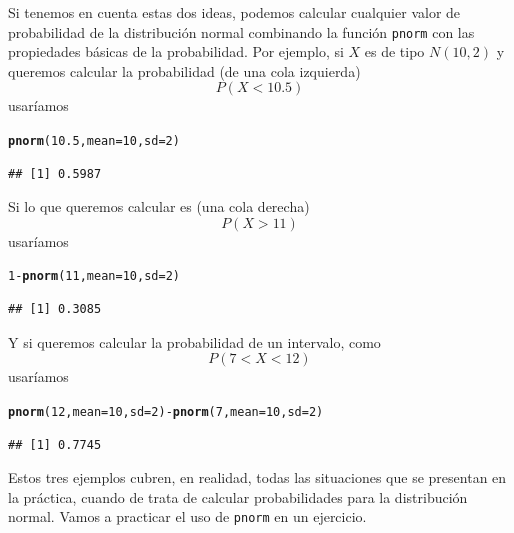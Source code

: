 \documentclass[10pt,a4paper]{article}\usepackage[]{graphicx}\usepackage[]{color}
\makeatletter
\newcommand{\hlnum}[1]{\textcolor[rgb]{0.686,0.059,0.569}{#1}}%
\newcommand{\hlopt}[1]{\textcolor[rgb]{0,0,0}{#1}}%
\newcommand{\hlstd}[1]{\textcolor[rgb]{0.345,0.345,0.345}{#1}}%
\newcommand{\hlkwc}[1]{\textcolor[rgb]{0.333,0.667,0.333}{#1}}%
\newcommand{\hlkwd}[1]{\textcolor[rgb]{0.737,0.353,0.396}{\textbf{#1}}}%
\newenvironment{kframe}{%
 \def\at@end@of@kframe{}%
 \ifinner\ifhmode%
  \def\at@end@of@kframe{\end{minipage}}%
  \begin{minipage}{\columnwidth}%
 \fi\fi%
 \def\FrameCommand##1{\hskip\@totalleftmargin \hskip-\fboxsep
 \colorbox{shadecolor}{##1}\hskip-\fboxsep
     \hskip-\linewidth \hskip-\@totalleftmargin \hskip\columnwidth}%
 \MakeFramed {\advance\hsize-\width
   \@totalleftmargin\z@ \linewidth\hsize
   \@setminipage}}%
 {\par\unskip\endMakeFramed%
 \at@end@of@kframe}
\newenvironment{knitrout}{}{} %
\makeatother
\begin{document}
Si tenemos en cuenta estas dos ideas, podemos calcular cualquier valor de probabilidad de la distribución normal combinando la función {\tt pnorm} con las propiedades básicas de la probabilidad. Por ejemplo, si $X$ es de tipo $N(10,2)$ y queremos calcular la probabilidad (de una cola izquierda)
\[P(X<10.5)\]
usaríamos
\begin{knitrout}
\color{fgcolor}\begin{kframe}
\begin{alltt}
\hlkwd{pnorm}\hlstd{(}\hlnum{10.5}\hlstd{,} \hlkwc{mean}\hlstd{=}\hlnum{10}\hlstd{,} \hlkwc{sd}\hlstd{=}\hlnum{2}\hlstd{)}
\end{alltt}
\begin{verbatim}
## [1] 0.5987
\end{verbatim}
\end{kframe}
\end{knitrout}
Si lo que queremos calcular es (una cola derecha)
\[P(X>11)\]
usaríamos
\begin{knitrout}
\color{fgcolor}\begin{kframe}
\begin{alltt}
    \hlnum{1}\hlopt{-}\hlkwd{pnorm}\hlstd{(}\hlnum{11}\hlstd{,} \hlkwc{mean}\hlstd{=}\hlnum{10}\hlstd{,} \hlkwc{sd}\hlstd{=}\hlnum{2}\hlstd{)}
\end{alltt}
\begin{verbatim}
## [1] 0.3085
\end{verbatim}
\end{kframe}
\end{knitrout}
Y si queremos calcular la probabilidad de un intervalo, como
\[
    P(7<X<12)
\]
usaríamos
\begin{knitrout}
\color{fgcolor}\begin{kframe}
\begin{alltt}
    \hlkwd{pnorm}\hlstd{(}\hlnum{12}\hlstd{,} \hlkwc{mean}\hlstd{=}\hlnum{10}\hlstd{,} \hlkwc{sd}\hlstd{=}\hlnum{2}\hlstd{)} \hlopt{-} \hlkwd{pnorm}\hlstd{(}\hlnum{7}\hlstd{,} \hlkwc{mean}\hlstd{=}\hlnum{10}\hlstd{,} \hlkwc{sd}\hlstd{=}\hlnum{2}\hlstd{)}
\end{alltt}
\begin{verbatim}
## [1] 0.7745
\end{verbatim}
\end{kframe}
\end{knitrout}
Estos tres ejemplos cubren, en realidad, todas las situaciones que se presentan en la práctica, cuando de trata de calcular probabilidades para la distribución normal. Vamos a practicar el uso de {\tt pnorm} en un ejercicio.
\end{document}
